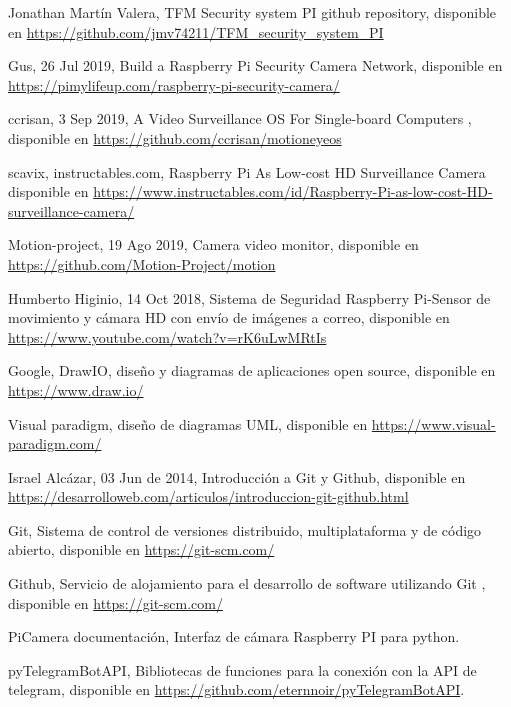 \thispagestyle{empty}

\begin{thebibliography}{99}

	 Jonathan Martín Valera, TFM Security system PI github repository, disponible en \url{https://github.com/jmv74211/TFM_security_system_PI}

	 Gus, 26 Jul 2019, Build a Raspberry Pi Security Camera Network,	disponible en \url{https://pimylifeup.com/raspberry-pi-security-camera/}
	
	 ccrisan, 3 Sep 2019, A Video Surveillance OS For Single-board Computers ,	disponible en \url{https://github.com/ccrisan/motioneyeos}
	
	 scavix, instructables.com, Raspberry Pi As Low-cost HD Surveillance Camera disponible en \url{https://www.instructables.com/id/Raspberry-Pi-as-low-cost-HD-surveillance-camera/}
	
	 Motion-project, 19 Ago 2019, Camera video monitor, disponible en \url{https://github.com/Motion-Project/motion}
	
	 Humberto Higinio, 14 Oct 2018, Sistema de Seguridad Raspberry Pi-Sensor de movimiento y cámara HD con envío de imágenes a correo, disponible en \url{https://www.youtube.com/watch?v=rK6uLwMRtIs}
	
	 Google, DrawIO, diseño y diagramas de aplicaciones open source, disponible en \url{https://www.draw.io/}
	
	 Visual paradigm, diseño de diagramas UML, disponible en \url{https://www.visual-paradigm.com/}
	
	 Israel Alcázar, 03 Jun de 2014,  Introducción a Git y Github, disponible en \url{https://desarrolloweb.com/articulos/introduccion-git-github.html}
	
	 Git, Sistema de control de versiones distribuido, multiplataforma y de código abierto, disponible en \url{https://git-scm.com/}
	
	 Github, Servicio de alojamiento para el desarrollo de software utilizando Git , disponible en \url{https://git-scm.com/}
	
	 PiCamera documentación, Interfaz de cámara Raspberry PI para python.
	
	 pyTelegramBotAPI, Bibliotecas de funciones para la conexión con la API de telegram, disponible en \url{https://github.com/eternnoir/pyTelegramBotAPI}.
	

\end{thebibliography}
